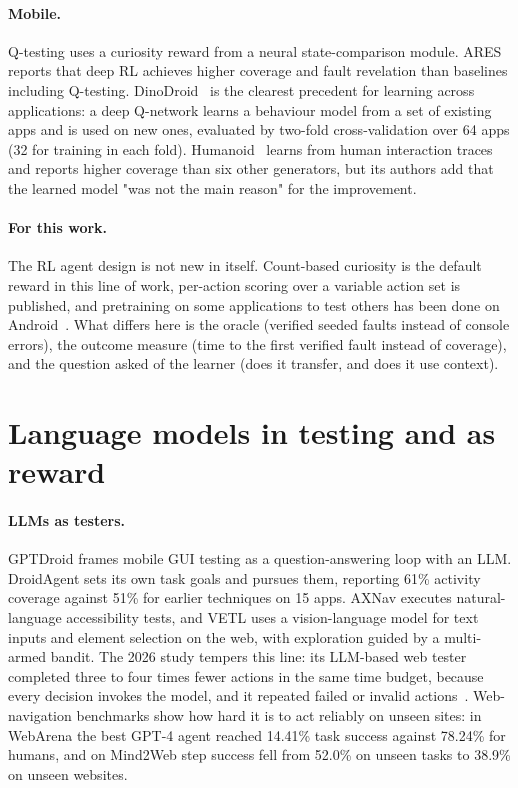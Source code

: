 \paragraph{Mobile.} Q-testing uses a curiosity reward from a neural
state-comparison module. ARES reports that deep RL achieves higher
coverage and fault revelation than baselines including Q-testing.
DinoDroid~\cite{zhao2024dinodroid} is the clearest precedent for learning across
applications: a deep Q-network learns a behaviour model from a set of existing apps and is
used on new ones, evaluated by two-fold cross-validation over 64 apps (32 for training in
each fold). Humanoid~\cite{li2019humanoid} learns from human interaction traces and reports
higher coverage than six other generators, but its authors add that the learned model "was
not the main reason" for the improvement.

\paragraph{For this work.} The RL agent design is not new in itself. Count-based curiosity
is the default reward in this line of work, per-action scoring over a variable action set is
published, and pretraining on some applications to test others has been
done on Android~\cite{zhao2024dinodroid}. What differs here is the oracle (verified seeded
faults instead of console errors), the outcome measure (time to the first verified fault
instead of coverage), and the question asked of the learner (does it transfer, and does it
use context).

\section{Language models in testing and as reward}
\label{sec:bg-llm}

\paragraph{LLMs as testers.} GPTDroid frames mobile GUI testing as a
question-answering loop with an LLM. DroidAgent sets its own task
goals and pursues them, reporting 61\% activity coverage against 51\% for earlier
techniques on 15 apps. AXNav executes natural-language accessibility
tests, and VETL uses a vision-language model for text inputs and element
selection on the web, with exploration guided by a multi-armed bandit. The 2026 study
tempers this line: its LLM-based web tester completed three to four times fewer actions in
the same time budget, because every decision invokes the model, and it repeated failed or
invalid actions~\cite{liu2026webgui}. Web-navigation benchmarks show how hard it is to act
reliably on unseen sites: in WebArena the best GPT-4 agent reached
14.41\% task success against 78.24\% for humans, and on Mind2Web
step success fell from 52.0\% on unseen tasks to 38.9\% on unseen websites.


